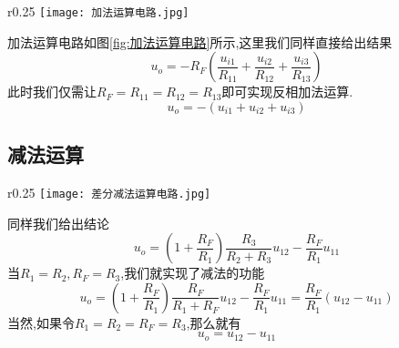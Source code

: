 \begin{wrapfigure}[9]{r}{0.25\textwidth}
    \centering
    \texttt{[image: 加法运算电路.jpg]}
    \caption{加法运算电路}
    \label{fig:加法运算电路}
\end{wrapfigure}
\Par 加法运算电路如图\ref{fig:加法运算电路}所示,这里我们同样直接给出结果
\begin{equation}
    u_o=-R_F\left( \frac{u_{i1}}{R_{11}}+\frac{u_{i2}}{R_{12}}+\frac{u_{i3}}{R_{13}} \right) 
\end{equation}
此时我们仅需让$R_F=R_{11}=R_{12}=R_{13}$即可实现反相加法运算.
\begin{equation}
    u_o=-\left( u_{i1}+u_{i2}+u_{i3} \right) 
\end{equation}

\subsection{\K 减法运算}

\begin{wrapfigure}{r}{0.25\textwidth}
    \centering
    \texttt{[image: 差分减法运算电路.jpg]}
    \caption{减法运算电路}
    \label{fig:减法运算电路}
\end{wrapfigure}
\Par 同样我们给出结论
\begin{equation}
    u_o=\left( 1+\frac{R_F}{R_1} \right) \frac{R_3}{R_2+R_3}u_{12}-\frac{R_F}{R_1}u_{11}
\end{equation}
当$R_1=R_2,R_F=R_3$,我们就实现了减法的功能
\begin{equation}
    u_o=\left( 1+\frac{R_F}{R_1} \right) \frac{R_F}{R_1+R_F}u_{12}-\frac{R_F}{R_1}u_{11}=\frac{R_F}{R_1}\left( u_{12}-u_{11} \right) 
\end{equation}
当然,如果令$R_1=R_2=R_F=R_3$,那么就有
\begin{equation}
    u_o=u_{12}-u_{11}
\end{equation}